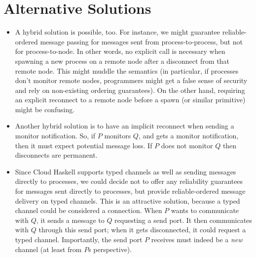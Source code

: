 \documentclass[10pt]{article}
\begin{document}
\section*{Alternative Solutions}

\begin{itemize}

\item A hybrid solution is possible, too. For instance, we might guarantee
reliable-ordered message passing for messages sent from process-to-process, but
not for process-to-node. In other words, no explicit call is necessary when
spawning a new process on a remote node after a disconnect from that remote
node. This might muddle the semantics (in particular, if processes don't
monitor remote nodes, programmers might get a false sense of security and rely
on non-existing ordering guarantees). On the other hand, requiring an explicit
reconnect to a remote node before a spawn (or similar primitive) might be
confusing. 

\item Another hybrid solution is to have an implicit reconnect when sending a
monitor notification. So, if $P$ monitors $Q$, and gets a monitor notification,
then it must expect potential message loss. If $P$ does not monitor $Q$ then
disconnects are permanent.

\item Since Cloud Haskell supports typed channels as well as sending messages
directly to processes, we could decide not to offer any reliability guarantees
for messages sent directly to processes, but provide reliable-ordered message
delivery on typed channels. This is an attractive solution, because a typed
channel could be considered a connection. When $P$ wants to communicate with
$Q$, it sends a message to $Q$ requesting a send port. It then communicates
with $Q$ through this send port; when it gets disconnected, it could request a
 typed channel. Importantly, the send port $P$ receives must indeed
be a \emph{new} channel (at least from $P$s perspective). 

\end{itemize}
\end{document}
